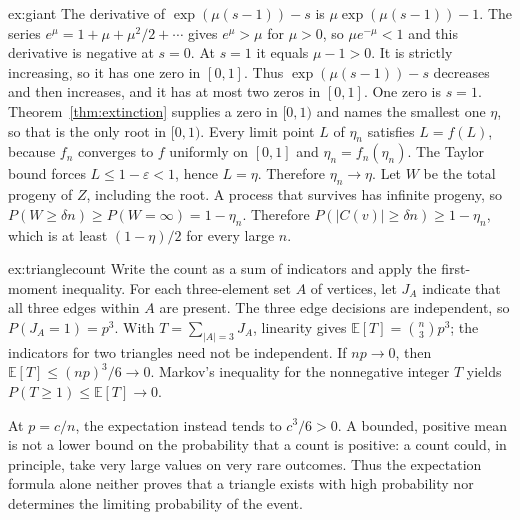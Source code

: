\begin{solution}{ex:giant}
The derivative of $\exp(\mu(s-1))-s$ is $\mu\exp(\mu(s-1))-1$. The series $e^\mu=1+\mu+\mu^2/2+\cdots$ gives $e^\mu>\mu$ for $\mu>0$, so $\mu e^{-\mu}<1$ and this derivative is negative at $s=0$. At $s=1$ it equals $\mu-1>0$. It is strictly increasing, so it has one zero in $[0,1]$. Thus $\exp(\mu(s-1))-s$ decreases and then increases, and it has at most two zeros in $[0,1]$. One zero is $s=1$. Theorem~\ref{thm:extinction} supplies a zero in $[0,1)$ and names the smallest one $\eta$, so that is the only root in $[0,1)$. Every limit point $L$ of $\eta_n$ satisfies $L=f(L)$, because $f_n$ converges to $f$ uniformly on $[0,1]$ and $\eta_n=f_n(\eta_n)$. The Taylor bound forces $L\le1-\varepsilon<1$, hence $L=\eta$. Therefore $\eta_n\to\eta$. Let $W$ be the total progeny of $Z$, including the root. A process that survives has infinite progeny, so $P(W\ge\delta n)\ge P(W=\infty)=1-\eta_n$. Therefore $P(|C(v)|\ge\delta n)\ge1-\eta_n$, which is at least $(1-\eta)/2$ for every large $n$.
\end{solution}


\begin{solution}{ex:trianglecount}
\idea Write the count as a sum of indicators and apply the first-moment inequality.
\writeup For each three-element set $A$ of vertices, let $J_A$ indicate that all three edges within $A$ are present. The three edge decisions are independent, so $P(J_A=1)=p^3$. With $T=\sum_{|A|=3}J_A$, linearity gives $\mathbb E[T]=\binom n3p^3$; the indicators for two triangles need not be independent. If $np\to0$, then $\mathbb E[T]\le (np)^3/6\to0$. Markov's inequality for the nonnegative integer $T$ yields $P(T\ge1)\le\mathbb E[T]\to0$.

At $p=c/n$, the expectation instead tends to $c^3/6>0$. A bounded, positive mean is not a lower bound on the probability that a count is positive: a count could, in principle, take very large values on very rare outcomes. Thus the expectation formula alone neither proves that a triangle exists with high probability nor determines the limiting probability of the event.
\end{solution}

